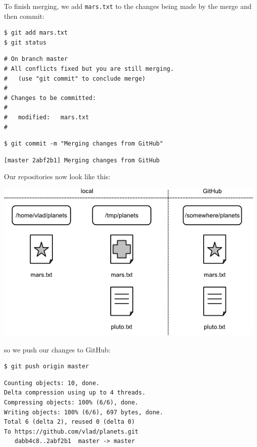 \documentclass[]{book}
\begin{document}
To finish merging, we add \texttt{mars.txt} to the changes being made by
the merge and then commit:

\begin{verbatim}
$ git add mars.txt
$ git status
\end{verbatim}

\begin{verbatim}
# On branch master
# All conflicts fixed but you are still merging.
#   (use "git commit" to conclude merge)
#
# Changes to be committed:
#
#   modified:   mars.txt
#
\end{verbatim}

\begin{verbatim}
$ git commit -m "Merging changes from GitHub"
\end{verbatim}

\begin{verbatim}
[master 2abf2b1] Merging changes from GitHub
\end{verbatim}

Our repositories now look like this:

\includegraphics{novice/git/img/git-after-second-conflicting-change.png}

so we push our changes to GitHub:

\begin{verbatim}
$ git push origin master
\end{verbatim}

\begin{verbatim}
Counting objects: 10, done.
Delta compression using up to 4 threads.
Compressing objects: 100% (6/6), done.
Writing objects: 100% (6/6), 697 bytes, done.
Total 6 (delta 2), reused 0 (delta 0)
To https://github.com/vlad/planets.git
   dabb4c8..2abf2b1  master -> master
\end{verbatim}
\end{document}
